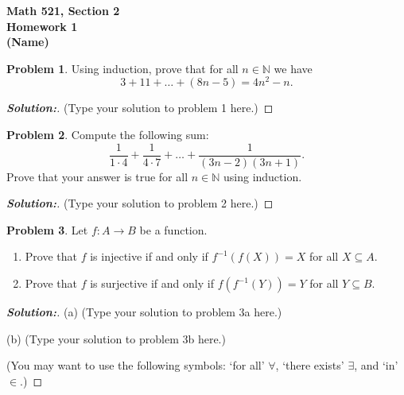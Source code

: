 \documentclass[12pt]{article}
\theoremstyle{definition}\newtheorem{problem}{Problem}
\newenvironment{solution}{\begin{proof}[\bfseries\textup{Solution:}]}{\end{proof}}
\begin{document}

\begin{center}
\bfseries Math 521, Section 2
\\ 
Homework 1
\\ 
(Name) %
\\ [24pt] 
\end{center}

\begin{problem}
Using induction, prove that for all $n\in\mathbb{N}$ we have
\begin{equation*}
3+11+\dots +(8n-5)=4n^2-n.
\end{equation*}
\end{problem}
\begin{solution}
(Type your solution to problem 1 here.)
\end{solution}

\newpage
\begin{problem}
Compute the following sum:
\begin{equation*}
\frac{1}{1\cdot 4} + \frac{1}{4\cdot 7} + \dots + \frac{1}{(3n-2)(3n+1)} .
\end{equation*}
Prove that your answer is true for all $n\in\mathbb{N}$ using induction.
\end{problem}
\begin{solution}
(Type your solution to problem 2 here.)
\end{solution}

\newpage
\begin{problem}
Let $f:A\to B$ be a function.  
\begin{enumerate}
\item Prove that $f$ is injective if and only if $f^{-1}(f(X)) = X$ for all $X\subseteq A$.
\item Prove that $f$ is surjective if and only if $f(f^{-1}(Y)) = Y$ for all $Y\subseteq B$.
\end{enumerate}
\end{problem}
\begin{solution}
(a) (Type your solution to problem 3a here.)

(b) (Type your solution to problem 3b here.)

(You may want to use the following symbols: `for all' $\forall$, `there exists' $\exists$, and `in' $\in$.)
\end{solution}
\end{document}
